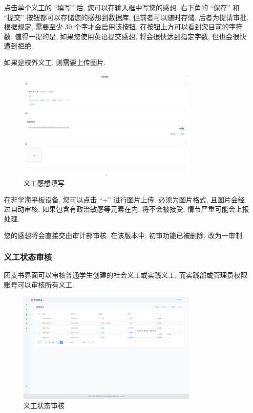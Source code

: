 \documentclass{article}
\begin{document}
点击单个义工的 ``填写'' 后, 您可以在输入框中写您的感想. 右下角的 ``保存'' 和 ``提交'' 按钮都可以存储您的感想到数据库, 但前者可以随时存储, 后者为提请审批, 根据规定, 需要至少 $30$ 个字才会启用该按钮. 在按钮上方可以看到您目前的字符数. 值得一提的是, 如果您使用英语提交感想, 将会很快达到指定字数, 但也会很快遭到拒绝.

如果是校外义工, 则需要上传图片.

\begin{figure}[H]
  \centering
  \includegraphics[width=0.8\textwidth]{../assets/image-20240303154235701.png}
  \caption{义工感想填写}
  \label{fig:volunteer-feelings-upload}
\end{figure}

在非学海平板设备, 您可以点击 ``+'' 进行图片上传. 必须为图片格式, 且图片会经过自动审核. 如果包含有政治敏感等元素在内, 将不会被接受. 情节严重可能会上报处理.

您的感想将会直接交由审计部审核. 在该版本中, 初审功能已被删除, 改为一审制.

\subsubsection{义工状态审核}

团支书界面可以审核普通学生创建的社会义工或实践义工, 而实践部或管理员权限账号可以审核所有义工.

\begin{figure}[H]
  \centering
  \includegraphics[width=0.8\textwidth]{../assets/image-20240303162112654.png}
  \caption{义工状态审核}
  \label{fig:volunteer-status}
\end{figure}
\end{document}
